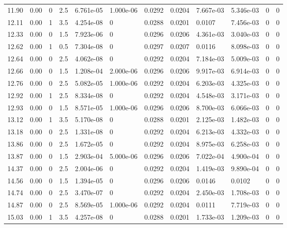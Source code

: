 \documentclass[preview]{standalone}
\begin{document}
{{{\begin{tabular}{L{1.2cm}C{1.2cm} C{0.3cm}C{0.5cm} C{1.4cm}C{1.4cm} C{1.4cm}C{1.4cm} C{1.6cm}C{1.6cm} C{1.6cm}C{1.6cm}}
  11.90  &  0.00  & 0     & 2.5 &  6.761e-05  & 1.000e-06  &  0.0292&   0.0204& 7.667e-03 & 5.346e-03   &  0 & 0  \\ 
  12.11  &  0.00  & 1     & 3.5 &  4.254e-08  & 0  &  0.0288&   0.0201& 0.0107 & 7.456e-03   &  0 & 0  \\ 
  12.33  &  0.00  & 0     & 1.5 &  7.923e-06  & 0  &  0.0296&   0.0206& 4.361e-03 & 3.040e-03   &  0 & 0  \\ 
  12.62  &  0.00  & 1     & 0.5 &  7.304e-08  & 0  &  0.0297&   0.0207& 0.0116 & 8.098e-03   &  0 & 0  \\ 
  12.64  &  0.00  & 0     & 2.5 &  4.062e-08  & 0  &  0.0292&   0.0204& 7.184e-03 & 5.009e-03   &  0 & 0  \\ 
  12.66  &  0.00  & 0     & 1.5 &  1.208e-04  & 2.000e-06  &  0.0296&   0.0206& 9.917e-03 & 6.914e-03   &  0 & 0  \\ 
  12.76  &  0.00  & 0     & 2.5 &  5.082e-05  & 1.000e-06  &  0.0292&   0.0204& 6.203e-03 & 4.325e-03   &  0 & 0  \\ 
  12.92  &  0.00  & 1     & 2.5 &  8.334e-08  & 0  &  0.0292&   0.0204& 4.548e-03 & 3.171e-03   &  0 & 0  \\ 
  12.93  &  0.00  & 0     & 1.5 &  8.571e-05  & 1.000e-06  &  0.0296&   0.0206& 8.700e-03 & 6.066e-03   &  0 & 0  \\ 
  13.12  &  0.00  & 1     & 3.5 &  5.170e-08  & 0  &  0.0288&   0.0201& 2.125e-03 & 1.482e-03   &  0 & 0  \\ 
  13.18  &  0.00  & 0     & 2.5 &  1.331e-08  & 0  &  0.0292&   0.0204& 6.213e-03 & 4.332e-03   &  0 & 0  \\ 
  13.86  &  0.00  & 0     & 2.5 &  1.672e-05  & 0  &  0.0292&   0.0204& 8.975e-03 & 6.258e-03   &  0 & 0  \\ 
  13.87  &  0.00  & 0     & 1.5 &  2.903e-04  & 5.000e-06  &  0.0296&   0.0206& 7.022e-04 & 4.900e-04   &  0 & 0  \\ 
  14.37  &  0.00  & 0     & 2.5 &  2.004e-06  & 0  &  0.0292&   0.0204& 1.419e-03 & 9.890e-04   &  0 & 0  \\ 
  14.56  &  0.00  & 0     & 1.5 &  1.394e-05  & 0  &  0.0296&   0.0206& 0.0146 & 0.0102   &  0 & 0  \\ 
  14.74  &  0.00  & 0     & 2.5 &  3.470e-07  & 0  &  0.0292&   0.0204& 2.450e-03 & 1.708e-03   &  0 & 0  \\ 
  14.87  &  0.00  & 0     & 2.5 &  8.569e-05  & 1.000e-06  &  0.0292&   0.0204& 0.0111 & 7.719e-03   &  0 & 0  \\ 
  15.03  &  0.00  & 1     & 3.5 &  4.257e-08  & 0  &  0.0288&   0.0201& 1.733e-03 & 1.209e-03   &  0 & 0  \\ 

\end{tabular}}}}
\end{document}
